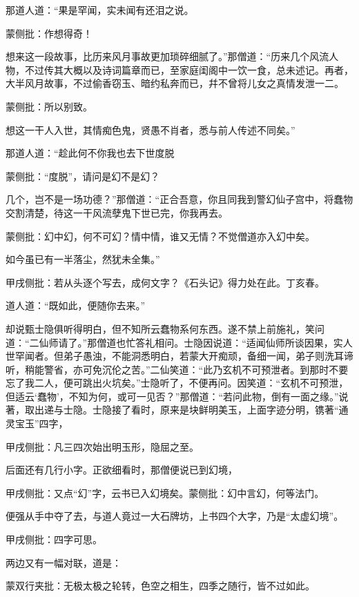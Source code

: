 \begin{parag}
    那道人道：“果是罕闻，实未闻有还泪之说。\begin{note}蒙侧批：作想得奇！\end{note}想来这一段故事，比历来风月事故更加琐碎细腻了。”那僧道：“历来几个风流人物，不过传其大概以及诗词篇章而已，至家庭闺阁中一饮一食，总未述记。再者，大半风月故事，不过偷香窃玉、暗约私奔而已，幷不曾将儿女之真情发泄一二。\begin{note}蒙侧批：所以别致。\end{note}想这一干人入世，其情痴色鬼，贤愚不肖者，悉与前人传述不同矣。”
\end{parag}


\begin{parag}
    那道人道：“趁此何不你我也去下世度脱\begin{note}蒙侧批：“度脱”，请问是幻不是幻？\end{note}几个，岂不是一场功德？”那僧道：“正合吾意，你且同我到警幻仙子宫中，将蠢物交割清楚，待这一干风流孽鬼下世已完，你我再去。\begin{note}蒙侧批：幻中幻，何不可幻？情中情，谁又无情？不觉僧道亦入幻中矣。\end{note}如今虽已有一半落尘，然犹未全集。”\begin{note}甲戌侧批：若从头逐个写去，成何文字？《石头记》得力处在此。丁亥春。\end{note}
\end{parag}


\begin{parag}
    道人道：“既如此，便随你去来。”
\end{parag}


\begin{parag}
    却说甄士隐俱听得明白，但不知所云蠢物系何东西。遂不禁上前施礼，笑问道：“二仙师请了。”那僧道也忙答礼相问。士隐因说道：“适闻仙师所谈因果，实人世罕闻者。但弟子愚浊，不能洞悉明白，若蒙大开痴顽，备细一闻，弟子则洗耳谛听，稍能警省，亦可免沉伦之苦。”二仙笑道：“此乃玄机不可预泄者。到那时不要忘了我二人，便可跳出火坑矣。”士隐听了，不便再问。因笑道：“玄机不可预泄，但适云‘蠢物’，不知为何，或可一见否？”那僧道：“若问此物，倒有一面之缘。”说著，取出递与士隐。士隐接了看时，原来是块鲜明美玉，上面字迹分明，镌著“通灵宝玉”四字，\begin{note}甲戌侧批：凡三四次始出明玉形，隐屈之至。\end{note}后面还有几行小字。正欲细看时，那僧便说已到幻境，\begin{note}甲戌侧批：又点“幻”字，云书已入幻境矣。蒙侧批：幻中言幻，何等法门。\end{note}便强从手中夺了去，与道人竟过一大石牌坊，上书四个大字，乃是“太虚幻境”。\begin{note}甲戌侧批：四字可思。\end{note}两边又有一幅对联，道是：\begin{note}蒙双行夹批：无极太极之轮转，色空之相生，四季之随行，皆不过如此。\end{note}
\end{parag}



